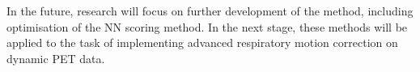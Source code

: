             In the future, research will focus on further development of the method, including optimisation of the \gls{NN} scoring method. In the next stage, these methods will be applied to the task of implementing advanced respiratory motion correction on dynamic \gls{PET} data.
    
        
        
            
        
            
            
            
            
